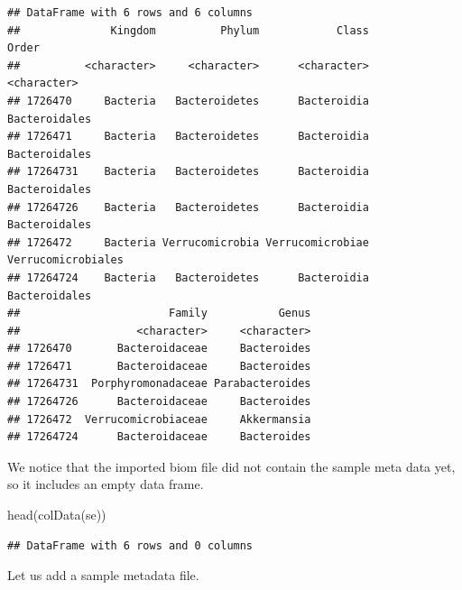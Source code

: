 \documentclass[
]{book}
\newenvironment{Shaded}{\begin{snugshade}}{\end{snugshade}}
\newcommand{\FunctionTok}[1]{\textcolor[rgb]{0.00,0.00,0.00}{#1}}
\newcommand{\NormalTok}[1]{#1}
\begin{document}
\begin{verbatim}
## DataFrame with 6 rows and 6 columns
##              Kingdom          Phylum            Class              Order
##          <character>     <character>      <character>        <character>
## 1726470     Bacteria   Bacteroidetes      Bacteroidia      Bacteroidales
## 1726471     Bacteria   Bacteroidetes      Bacteroidia      Bacteroidales
## 17264731    Bacteria   Bacteroidetes      Bacteroidia      Bacteroidales
## 17264726    Bacteria   Bacteroidetes      Bacteroidia      Bacteroidales
## 1726472     Bacteria Verrucomicrobia Verrucomicrobiae Verrucomicrobiales
## 17264724    Bacteria   Bacteroidetes      Bacteroidia      Bacteroidales
##                       Family           Genus
##                  <character>     <character>
## 1726470       Bacteroidaceae     Bacteroides
## 1726471       Bacteroidaceae     Bacteroides
## 17264731  Porphyromonadaceae Parabacteroides
## 17264726      Bacteroidaceae     Bacteroides
## 1726472  Verrucomicrobiaceae     Akkermansia
## 17264724      Bacteroidaceae     Bacteroides
\end{verbatim}

We notice that the imported biom file did not contain the sample meta data
yet, so it includes an empty data frame.

\begin{Shaded}
\begin{Highlighting}[]
\FunctionTok{head}\NormalTok{(}\FunctionTok{colData}\NormalTok{(se))}
\end{Highlighting}
\end{Shaded}

\begin{verbatim}
## DataFrame with 6 rows and 0 columns
\end{verbatim}

Let us add a sample metadata file.
\end{document}
